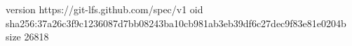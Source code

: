 version https://git-lfs.github.com/spec/v1
oid sha256:37a26c3f9c1236087d7bb08243ba10cb981ab3eb39df6c27dec9f83e81e0204b
size 26818

